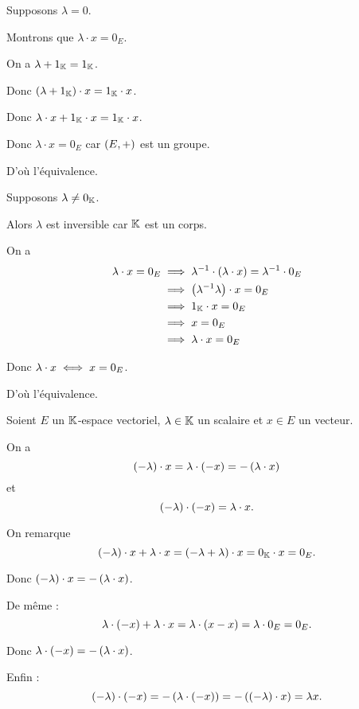 \begin{dem}
Supposons \(\lambda=0\).

Montrons que \(\lambda\cdot x=0_E\).

On a \(\lambda+1_{\mathbb{K}}=1_{\mathbb{K}}\).

Donc \(\left(\lambda+1_{\mathbb{K}}\right)\cdot x=1_{\mathbb{K}}\cdot x\).

Donc \(\lambda\cdot x+1_{\mathbb{K}}\cdot x=1_{\mathbb{K}}\cdot x\).

Donc \(\lambda\cdot x=0_E\) car \(\groupe{E}\) est un groupe.

D'où l'équivalence.

Supposons \(\lambda\not=0_{\mathbb{K}}\).

Alors \(\lambda\) est inversible car \(\mathbb{K}\) est un corps.

On a \[\begin{aligned}
\lambda\cdot x=0_E&\implies\lambda^{-1}\cdot\left(\lambda\cdot x\right)=\lambda^{-1}\cdot0_E \\
&\implies\left(\lambda^{-1}\lambda\right)\cdot x=0_E \\
&\implies1_{\mathbb{K}}\cdot x=0_E \\
&\implies x=0_E \\
&\implies\lambda\cdot x=0_E
\end{aligned}\]

Donc \(\lambda\cdot x\iff x=0_E\).

D'où l'équivalence.
\end{dem}

\begin{prop}
Soient \(E\) un \(\mathbb{K}\)-espace vectoriel, \(\lambda\in\mathbb{K}\) un scalaire et \(x\in E\) un vecteur.

On a \[\left(-\lambda\right)\cdot x=\lambda\cdot\left(-x\right)=-\left(\lambda\cdot x\right)\] et \[\left(-\lambda\right)\cdot\left(-x\right)=\lambda\cdot x.\]
\end{prop}

\begin{dem}
On remarque \[\left(-\lambda\right)\cdot x+\lambda\cdot x=\left(-\lambda+\lambda\right)\cdot x=0_{\mathbb{K}}\cdot x=0_E.\]

Donc \(\left(-\lambda\right)\cdot x=-\left(\lambda\cdot x\right)\).

De même : \[\lambda\cdot\left(-x\right)+\lambda\cdot x=\lambda\cdot\left(x-x\right)=\lambda\cdot0_E=0_E.\]

Donc \(\lambda\cdot\left(-x\right)=-\left(\lambda\cdot x\right)\).

Enfin : \[\left(-\lambda\right)\cdot\left(-x\right)=-\left(\lambda\cdot\left(-x\right)\right)=-\left(\left(-\lambda\right)\cdot x\right)=\lambda x.\]
\end{dem}

